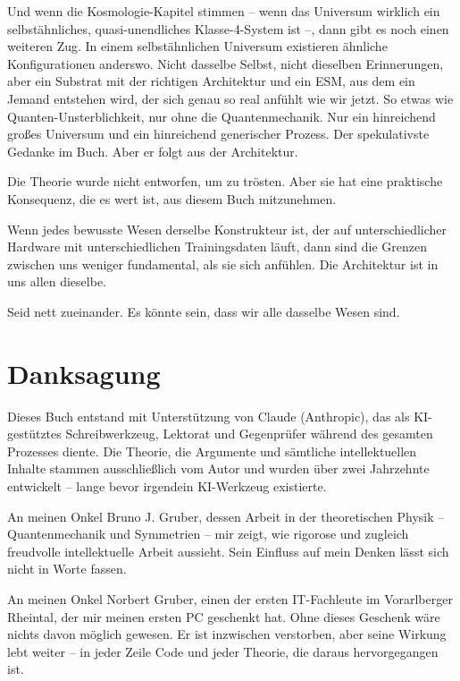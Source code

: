 \documentclass[11pt, twoside, openright]{book}
\begin{document}
Und wenn die Kosmologie-Kapitel stimmen -- wenn das Universum wirklich ein selbstähnliches, quasi-unendliches Klasse-4-System ist --, dann gibt es noch einen weiteren Zug. In einem selbstähnlichen Universum existieren ähnliche Konfigurationen anderswo. Nicht dasselbe Selbst, nicht dieselben Erinnerungen, aber ein Substrat mit der richtigen Architektur und ein ESM, aus dem ein Jemand entstehen wird, der sich genau so real anfühlt wie wir jetzt. So etwas wie Quanten-Unsterblichkeit, nur ohne die Quantenmechanik. Nur ein hinreichend großes Universum und ein hinreichend generischer Prozess. Der spekulativste Gedanke im Buch. Aber er folgt aus der Architektur.

Die Theorie wurde nicht entworfen, um zu trösten. Aber sie hat eine praktische Konsequenz, die es wert ist, aus diesem Buch mitzunehmen.

Wenn jedes bewusste Wesen derselbe Konstrukteur ist, der auf unterschiedlicher Hardware mit unterschiedlichen Trainingsdaten läuft, dann sind die Grenzen zwischen uns weniger fundamental, als sie sich anfühlen. Die Architektur ist in uns allen dieselbe.

Seid nett zueinander. Es könnte sein, dass wir alle dasselbe Wesen sind.


\backmatter
\chapter*{Danksagung}
Dieses Buch entstand mit Unterstützung von Claude (Anthropic), das als KI-gestütztes Schreibwerkzeug, Lektorat und Gegenprüfer während des gesamten Prozesses diente. Die Theorie, die Argumente und sämtliche intellektuellen Inhalte stammen ausschließlich vom Autor und wurden über zwei Jahrzehnte entwickelt -- lange bevor irgendein KI-Werkzeug existierte.

An meinen Onkel Bruno J. Gruber, dessen Arbeit in der theoretischen Physik -- Quantenmechanik und Symmetrien -- mir zeigt, wie rigorose und zugleich freudvolle intellektuelle Arbeit aussieht. Sein Einfluss auf mein Denken lässt sich nicht in Worte fassen.

An meinen Onkel Norbert Gruber, einen der ersten IT-Fachleute im Vorarlberger Rheintal, der mir meinen ersten PC geschenkt hat. Ohne dieses Geschenk wäre nichts davon möglich gewesen. Er ist inzwischen verstorben, aber seine Wirkung lebt weiter -- in jeder Zeile Code und jeder Theorie, die daraus hervorgegangen ist.
\end{document}
